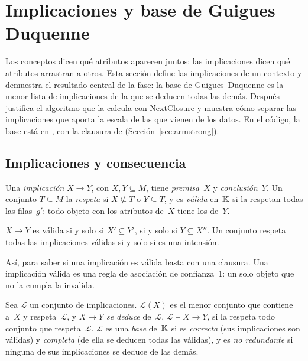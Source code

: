 \section{Implicaciones y base de Guigues--Duquenne}
\label{sec:implicaciones}

Los conceptos dicen qué atributos aparecen juntos; las implicaciones dicen qué atributos arrastran a otros. Esta sección define las implicaciones de un contexto y demuestra el resultado central de la fase: la base de Guigues--Duquenne es la menor lista de implicaciones de la que se deducen todas las demás. Después justifica el algoritmo que la calcula con NextClosure y muestra cómo separar las implicaciones que aporta la escala de las que vienen de los datos. En el código, la base está en , con la clausura de  (Sección~\ref{sec:armstrong}).


\subsection{Implicaciones y consecuencia}
\label{sec:implicaciones-def}

\begin{definicion}[implicación]\label{def:implicacion}
Una \emph{implicación} $X \to Y$, con $X, Y \subseteq M$, tiene \emph{premisa}~$X$ y \emph{conclusión}~$Y$. Un conjunto $T \subseteq M$ la \emph{respeta} si $X \not\subseteq T$ o $Y \subseteq T$, y es \emph{válida} en~$\mathbb{K}$ si la respetan todas las filas~$g'$: todo objeto con los atributos de~$X$ tiene los de~$Y$.
\end{definicion}

\begin{proposicion}\label{prop:validez}
$X \to Y$ es válida si y solo si $X' \subseteq Y'$, si y solo si $Y \subseteq X''$. Un conjunto respeta todas las implicaciones válidas si y solo si es una intensión.
\end{proposicion}

Así, para saber si una implicación es válida basta con una clausura. Una implicación válida es una regla de asociación de confianza~1: un solo objeto que no la cumpla la invalida.

\begin{definicion}\label{def:base}
Sea $\mathcal{L}$ un conjunto de implicaciones. $\mathcal{L}(X)$ es el menor conjunto que contiene a~$X$ y respeta~$\mathcal{L}$, y $X \to Y$ \emph{se deduce} de~$\mathcal{L}$, $\mathcal{L} \models X \to Y$, si la respeta todo conjunto que respeta~$\mathcal{L}$. $\mathcal{L}$ es una \emph{base} de~$\mathbb{K}$ si es \emph{correcta} (sus implicaciones son válidas) y \emph{completa} (de ella se deducen todas las válidas), y es \emph{no redundante} si ninguna de sus implicaciones se deduce de las demás.
\end{definicion}

